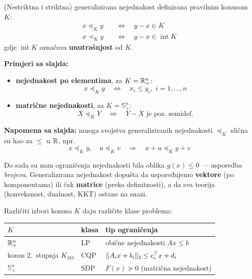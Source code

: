 \begin{definicija}
(Nestriktna i striktna) generalizirana nejednakost definirana pravilnim
konusom $K$:
\begin{align}
x \preceq_K y \quad&\Leftrightarrow\quad y - x \in K \\
x \prec_K y \quad&\Leftrightarrow\quad y - x \in \operatorname{int}K
\end{align}
gdje $\operatorname{int}K$ označava \textbf{unutrašnjost} od $K$.
\end{definicija}

\textbf{Primjeri sa slajda:}

\begin{itemize}
  \item \textbf{nejednakost po elementima}, za $K = \mathbb{R}^n_+$:
        \[
        x \preceq_K y \quad\Leftrightarrow\quad x_i \le y_i,\; i = 1,\dots,n
        \]
  \item \textbf{matrične nejednakosti}, za $K = \mathbb{S}^n_+$:
        \[
        X \preceq_K Y \quad\Leftrightarrow\quad Y - X \text{ je poz.\ semidef.}
        \]
\end{itemize}

\textbf{Napomena sa slajda:} mnoga svojstva generaliziranih nejednakosti
$\preceq_K$ slična su kao za $\le$ u $\mathbb{R}$, npr.
\[
x \preceq_K y, \quad u \preceq_K v
\quad\Longrightarrow\quad x + u \preceq_K y + v
\]

\begin{napomena}
Do sada su nam ograničenja nejednakosti bila oblika $g(x) \le 0$ --- usporedba
\emph{brojeva}. Generalizirana nejednakost dopušta da uspoređujemo
\textbf{vektore} (po komponentama) ili čak \textbf{matrice} (preko
definitnosti), a da sva teorija (konveksnost, dualnost, KKT) ostane na snazi.

Različiti izbori konusa $K$ daju različite klase problema:
\begin{center}
\begin{tabular}{llP{4.6cm}}
\toprule
$K$ & \textbf{klasa} & \textbf{tip ograničenja} \\
\midrule
$\mathbb{R}^n_+$ & LP & obične nejednakosti $Ax \le b$ \\
konus 2.\ stupnja $K_{SO}$ & CQP & $\|A_ix + b_i\|_2 \le c_i^{\top} x + d_i$ \\
$\mathbb{S}^n_+$ & SDP & $F(x) \succeq 0$ (matrična nejednakost) \\
\bottomrule
\end{tabular}
\end{center}
\end{napomena}

